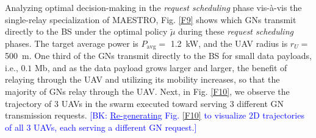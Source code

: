 \documentclass[12pt, draftcls, onecolumn]{IEEEtran}
\theoremstyle{plain}
\theoremstyle{definition}
\theoremstyle{remark}
\newcommand{\bk}[1]{\textcolor{blue}{[BK: #1]}}
\begin{document}
Analyzing optimal decision-making in the \emph{request scheduling} phase vis-à-vis the single-relay specialization of MAESTRO, Fig. \ref{F9} shows which GNs transmit directly to the BS under the optimal policy $\tilde{\mu}$ during these \emph{request scheduling} phases. The target average power is $P_{\mathrm{avg}}=$ \qty[mode=text]{1.2}{\kilo\watt}, and the UAV radius is $r_U=$ \qty[mode=text]{500}{\meter}. One third of the GNs transmit directly to the BS for small data payloads, i.e., $0.1$ Mb, and as the data payload grows larger and larger, the benefit of relaying through the UAV and utilizing its mobility increases, so that the majority of GNs relay through the UAV. Next, in Fig. \ref{F10}, we observe the trajectory of $3$ UAVs in the swarm executed toward serving $3$ different GN transmission requests. \bk{\underline{Re-generating} Fig. \ref{F10} to visualize $2$D trajectories of all $3$ UAVs, each serving a different GN request.}
\end{document}
